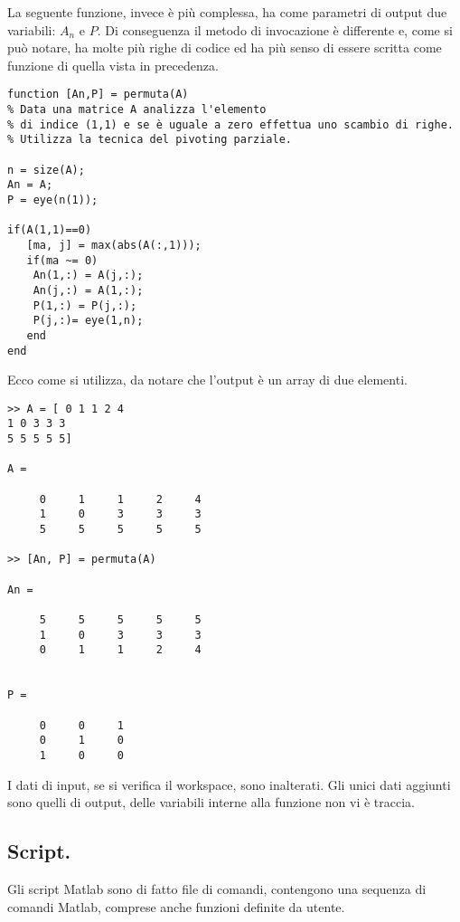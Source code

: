 \begin{exe}
La seguente funzione, invece è più complessa, ha come parametri di output
due variabili: $A_n$ e $P$. Di conseguenza il metodo di invocazione è differente
e, come si può notare, ha molte più righe di codice ed ha più senso di essere
scritta come funzione di quella vista in precedenza.
\begin{codice}
\begin{verbatim}
function [An,P] = permuta(A)
% Data una matrice A analizza l'elemento
% di indice (1,1) e se è uguale a zero effettua uno scambio di righe.
% Utilizza la tecnica del pivoting parziale.

n = size(A);
An = A;
P = eye(n(1));

if(A(1,1)==0)
   [ma, j] = max(abs(A(:,1)));
   if(ma ~= 0)
    An(1,:) = A(j,:); 
    An(j,:) = A(1,:);
    P(1,:) = P(j,:);
    P(j,:)= eye(1,n);
   end
end
\end{verbatim}
\end{codice}
Ecco come si utilizza, da notare che l'output è un array di due elementi.

\begin{codice}
\begin{verbatim}
>> A = [ 0 1 1 2 4
1 0 3 3 3
5 5 5 5 5]

A =

     0     1     1     2     4
     1     0     3     3     3
     5     5     5     5     5

>> [An, P] = permuta(A)

An =

     5     5     5     5     5
     1     0     3     3     3
     0     1     1     2     4


P =

     0     0     1
     0     1     0
     1     0     0

\end{verbatim}
\end{codice}
I dati di input, se si verifica il workspace, sono inalterati. Gli unici dati
aggiunti sono quelli di output, delle variabili interne alla funzione non vi
è traccia.
\end{exe}

\subsection{Script.}
Gli script Matlab sono di fatto file di comandi, contengono una sequenza di 
comandi Matlab, comprese anche funzioni definite da utente.

